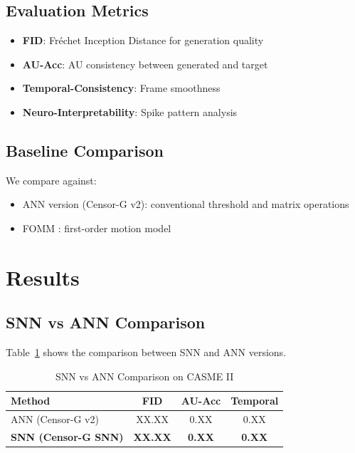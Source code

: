 \documentclass[preprint,12pt]{elsarticle}
\begin{document}
\subsection{Evaluation Metrics}

\begin{itemize}
\item \textbf{FID}: Fréchet Inception Distance for generation quality
\item \textbf{AU-Acc}: AU consistency between generated and target
\item \textbf{Temporal-Consistency}: Frame smoothness
\item \textbf{Neuro-Interpretability}: Spike pattern analysis
\end{itemize}

\subsection{Baseline Comparison}

We compare against:
\begin{itemize}
\item ANN version (Censor-G v2): conventional threshold and matrix operations
\item FOMM \cite{fomm2019}: first-order motion model
\end{itemize}

\section{Results}
\label{sec:results}

\subsection{SNN vs ANN Comparison}

Table~\ref{tab:snn_ann} shows the comparison between SNN and ANN versions.

\begin{table}[htbp]
\centering
\caption{SNN vs ANN Comparison on CASME II}
\label{tab:snn_ann}
\begin{tabular}{lccc}
\toprule
Method & FID & AU-Acc & Temporal \\
\midrule
ANN (Censor-G v2) & XX.XX & 0.XX & 0.XX \\
\textbf{SNN (Censor-G SNN)} & \textbf{XX.XX} & \textbf{0.XX} & \textbf{0.XX} \\
\bottomrule
\end{tabular}
\end{table}
\end{document}
